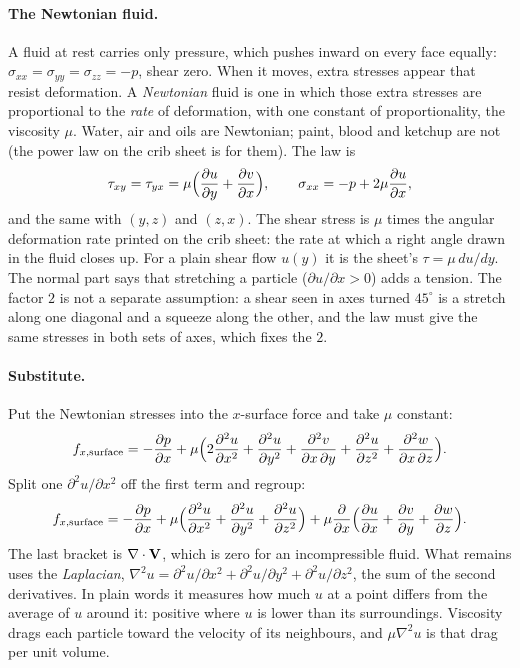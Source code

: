 \paragraph{The Newtonian fluid.} A fluid at rest carries only pressure, which pushes inward on every face equally: $\sigma_{xx} = \sigma_{yy} = \sigma_{zz} = -p$, shear zero. When it moves, extra stresses appear that resist deformation. A \emph{Newtonian} fluid is one in which those extra stresses are proportional to the \emph{rate} of deformation, with one constant of proportionality, the viscosity $\mu$. Water, air and oils are Newtonian; paint, blood and ketchup are not (the power law on the crib sheet is for them). The law is
\[
\tau_{xy} = \tau_{yx} = \mu\Big(\frac{\partial u}{\partial y} + \frac{\partial v}{\partial x}\Big), \qquad
\sigma_{xx} = -p + 2\mu\frac{\partial u}{\partial x},
\]
and the same with $(y,z)$ and $(z,x)$. The shear stress is $\mu$ times the angular deformation rate printed on the crib sheet: the rate at which a right angle drawn in the fluid closes up. For a plain shear flow $u(y)$ it is the sheet's $\tau = \mu\,du/dy$. The normal part says that stretching a particle ($\partial u/\partial x > 0$) adds a tension. The factor $2$ is not a separate assumption: a shear seen in axes turned $45^\circ$ is a stretch along one diagonal and a squeeze along the other, and the law must give the same stresses in both sets of axes, which fixes the $2$.

\paragraph{Substitute.} Put the Newtonian stresses into the $x$-surface force and take $\mu$ constant:
\[
f_{x,\text{surface}} = -\frac{\partial p}{\partial x} + \mu\Big(2\frac{\partial^2 u}{\partial x^2} + \frac{\partial^2 u}{\partial y^2} + \frac{\partial^2 v}{\partial x\,\partial y} + \frac{\partial^2 u}{\partial z^2} + \frac{\partial^2 w}{\partial x\,\partial z}\Big).
\]
Split one $\partial^2 u/\partial x^2$ off the first term and regroup:
\[
f_{x,\text{surface}} = -\frac{\partial p}{\partial x} + \mu\Big(\frac{\partial^2 u}{\partial x^2} + \frac{\partial^2 u}{\partial y^2} + \frac{\partial^2 u}{\partial z^2}\Big) + \mu\frac{\partial }{\partial x}\Big(\frac{\partial u}{\partial x} + \frac{\partial v}{\partial y} + \frac{\partial w}{\partial z}\Big).
\]
The last bracket is $\nabla\cdot\mathbf{V}$, which is zero for an incompressible fluid. What remains uses the \emph{Laplacian}, $\nabla^2 u = \partial^2 u/\partial x^2 + \partial^2 u/\partial y^2 + \partial^2 u/\partial z^2$, the sum of the second derivatives. In plain words it measures how much $u$ at a point differs from the average of $u$ around it: positive where $u$ is lower than its surroundings. Viscosity drags each particle toward the velocity of its neighbours, and $\mu\nabla^2 u$ is that drag per unit volume.

